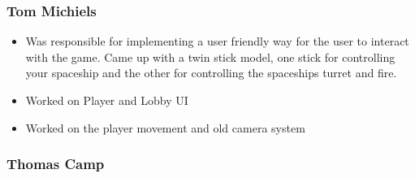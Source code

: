 \documentclass[11pt,a4paper]{article}
\begin{document}
        \subsubsection{Tom Michiels}

        \begin{itemize}
          \item Was responsible for implementing a user friendly way for the user to interact with the game. Came up with a twin stick model, one stick for controlling your spaceship and the other for controlling the spaceships turret and fire.
          \item Worked on Player and Lobby UI
          \item Worked on the player movement and old camera system
        \end{itemize}

        \pagebreak

        \subsubsection{Thomas Camp}
\end{document}
